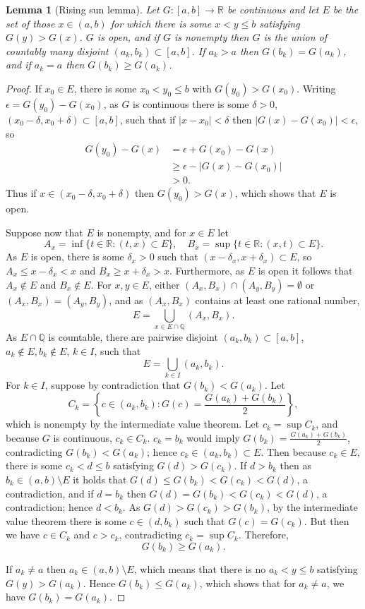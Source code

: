 \documentclass{article}
\newtheorem{lemma}[theorem]{Lemma}
\theoremstyle{definition}
\begin{document}
\begin{lemma}[Rising sun lemma]
Let $G:[a,b] \to \mathbb{R}$ be continuous and let $E$ be the set of those $x \in (a,b)$ for which there is some
$x<y \leq b$ satisfying $G(y)>G(x)$. $G$ is open, and if $G$ is nonempty then $G$ is the union of countably many disjoint 
$(a_k,b_k) \subset [a,b]$. If $a_k>a$ then $G(b_k)=G(a_k)$, and if $a_k=a$ then $G(b_k) \geq G(a_k)$.   
\end{lemma}
\begin{proof}
If $x_0 \in E$, there is some $x_0<y_0 \leq b$ with $G(y_0)>G(x_0)$.
Writing $\epsilon=G(y_0)-G(x_0)$,  as $G$ is continuous there is some
$\delta>0$,
$(x_0-\delta,x_0+\delta) \subset [a,b]$,
 such that if $|x-x_0|<\delta$ then $|G(x)-G(x_0)| < \epsilon$, so
\begin{align*}
G(y_0)-G(x)&=\epsilon+G(x_0)-G(x)\\
&\geq \epsilon - |G(x)-G(x_0)|\\
&>0.
\end{align*}
Thus if $x \in (x_0-\delta,x_0+\delta)$ then $G(y_0)>G(x)$, which shows that $E$ is open.

Suppose now that $E$ is nonempty, and for $x \in E$ let
\[
A_x = \inf\{ t \in \mathbb{R}: (t,x) \subset E\},\quad
B_x = \sup\{ t \in \mathbb{R}: (x,t) \subset E\}.
\]
As $E$ is open, there is some $\delta_x>0$ such that $(x-\delta_x,x+\delta_x) \subset E$,
so $A_x \leq x-\delta_x<x$ and $B_x \geq x+\delta_x>x$. 
Furthermore, as $E$ is open it follows that $A_x \not \in E$ and $B_x \not \in E$. 
For $x,y \in E$, either $(A_x,B_x) \cap (A_y,B_y) =  \emptyset$ or $(A_x,B_x)=(A_y,B_y)$, and as $(A_x,B_x)$ contains
at least one rational number,
\[
E = \bigcup_{x \in E \cap \mathbb{Q}} (A_x,B_x).
\]
As $E \cap \mathbb{Q}$ is countable, there are pairwise disjoint $(a_k,b_k) \subset [a,b]$, $a_k \not \in E, b_k \not \in E$, $k \in I$, such that
\[
E = \bigcup_{k \in I} (a_k,b_k).
\] 
For $k \in I$, suppose by contradiction that $G(b_k)<G(a_k)$. Let
\[
C_k=\left\{c \in (a_k,b_k) : G(c) = \frac{G(a_k)+G(b_k)}{2}\right\},
\]
which is nonempty by the intermediate value theorem.
 Let $c_k = \sup C_k$,
 and  because $G$ is continuous, $c_k \in C_k$. 
$c_k = b_k$ would imply $G(b_k) = \frac{G(a_k)+G(b_k)}{2}$, contradicting  $G(b_k)<G(a_k)$; hence
$c_k \in (a_k,b_k) \subset  E$. 
Then because $c_k \in E$, there is some $c_k<d \leq b$ satisfying $G(d)>G(c_k)$. If $d>b_k$ then as
$b_k \in (a,b) \setminus E$ it holds that $G(d) \leq G(b_k)<G(c_k)<G(d)$, a contradiction, and if $d = b_k$ then
$G(d) = G(b_k) < G(c_k) < G(d)$, a contradiction; hence 
$d < b_k$. As $G(d)>G(c_k)>G(b_k)$, by the intermediate value theorem there is some
$c \in (d,b_k)$ such that $G(c)=G(c_k)$. But then we have $c \in C_k$ and $c>c_k$, contradicting
$c_k = \sup C_k$. Therefore, 
\[
G(b_k) \geq G(a_k).
\]

If $a_k \neq a$ then $a_k \in (a,b) \setminus E$, which means that there is no $a_k<y \leq b$ satisfying
$G(y)>G(a_k)$. Hence $G(b_k) \leq G(a_k)$, which shows that for $a_k \neq a$, we have
$G(b_k)=G(a_k)$. 
\end{proof}
\end{document}
